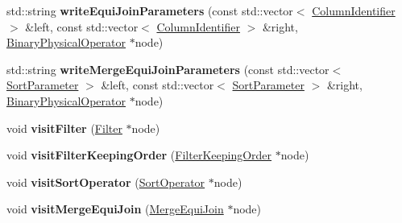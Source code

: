 \begin{DoxyCompactItemize}
\item 
\hypertarget{class_bobox_plan_writing_physical_operator_visitor_a03f4fd96dbe1a60b5e562a3e200d1263}{std\+::string {\bfseries write\+Equi\+Join\+Parameters} (const std\+::vector$<$ \hyperlink{class_column_identifier}{Column\+Identifier} $>$ \&left, const std\+::vector$<$ \hyperlink{class_column_identifier}{Column\+Identifier} $>$ \&right, \hyperlink{class_binary_physical_operator}{Binary\+Physical\+Operator} $\ast$node)}\label{class_bobox_plan_writing_physical_operator_visitor_a03f4fd96dbe1a60b5e562a3e200d1263}

\item 
\hypertarget{class_bobox_plan_writing_physical_operator_visitor_a30e0f62016ad2037261b8daa69752d5f}{std\+::string {\bfseries write\+Merge\+Equi\+Join\+Parameters} (const std\+::vector$<$ \hyperlink{class_sort_parameter}{Sort\+Parameter} $>$ \&left, const std\+::vector$<$ \hyperlink{class_sort_parameter}{Sort\+Parameter} $>$ \&right, \hyperlink{class_binary_physical_operator}{Binary\+Physical\+Operator} $\ast$node)}\label{class_bobox_plan_writing_physical_operator_visitor_a30e0f62016ad2037261b8daa69752d5f}

\item 
\hypertarget{class_bobox_plan_writing_physical_operator_visitor_a443e89add4155e51b2d7d1973afb3af5}{void {\bfseries visit\+Filter} (\hyperlink{class_filter}{Filter} $\ast$node)}\label{class_bobox_plan_writing_physical_operator_visitor_a443e89add4155e51b2d7d1973afb3af5}

\item 
\hypertarget{class_bobox_plan_writing_physical_operator_visitor_a041f79a1705915af0d45e623ad7a18ac}{void {\bfseries visit\+Filter\+Keeping\+Order} (\hyperlink{class_filter_keeping_order}{Filter\+Keeping\+Order} $\ast$node)}\label{class_bobox_plan_writing_physical_operator_visitor_a041f79a1705915af0d45e623ad7a18ac}

\item 
\hypertarget{class_bobox_plan_writing_physical_operator_visitor_ac482fb6eae4e0bcb957bad6c572a2c03}{void {\bfseries visit\+Sort\+Operator} (\hyperlink{class_sort_operator}{Sort\+Operator} $\ast$node)}\label{class_bobox_plan_writing_physical_operator_visitor_ac482fb6eae4e0bcb957bad6c572a2c03}

\item 
\hypertarget{class_bobox_plan_writing_physical_operator_visitor_ac66108bf441456b57aded81ac17b111b}{void {\bfseries visit\+Merge\+Equi\+Join} (\hyperlink{class_merge_equi_join}{Merge\+Equi\+Join} $\ast$node)}\label{class_bobox_plan_writing_physical_operator_visitor_ac66108bf441456b57aded81ac17b111b}


\end{DoxyCompactItemize}
